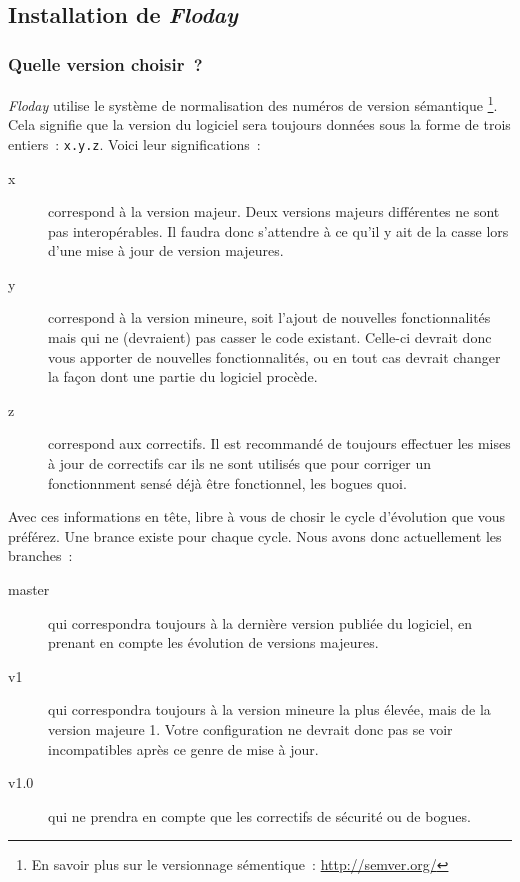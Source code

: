 \subsection{Installation de \emph{Floday}}

\subsubsection{Quelle version choisir~?}

\emph{Floday} utilise le système de normalisation des numéros de version sémantique%
\footnote{En savoir plus sur le versionnage sémentique~: \url{http://semver.org/}}.
Cela signifie que la version du logiciel sera toujours données sous la forme de trois entiers~: {\tt{}x.y.z}.
Voici leur significations~:

\begin{description}
	\item[x] correspond à la version majeur. Deux versions majeurs différentes ne sont pas interopérables.
Il faudra donc s'attendre à ce qu'il y ait de la casse lors d'une mise à jour  de version majeures.
	\item[y] correspond à la version mineure, soit l'ajout de nouvelles fonctionnalités mais qui ne (devraient) pas casser le code existant. Celle-ci devrait donc vous apporter de nouvelles fonctionnalités, ou en tout cas devrait changer la façon dont une partie du logiciel procède.
	\item[z] correspond aux correctifs. Il est recommandé de toujours effectuer les mises à jour de correctifs car ils ne sont utilisés que pour corriger un fonctionnment sensé déjà être fonctionnel, les bogues quoi.
\end{description}

Avec ces informations en tête, libre à vous de chosir le cycle d'évolution que vous préférez. Une brance existe pour chaque cycle. Nous avons donc actuellement les branches~:
\begin{description}
	\item[master] qui correspondra toujours à la dernière version publiée du logiciel, en prenant en compte les évolution de versions majeures.
	\item[v1] qui correspondra toujours à la version mineure la plus élevée, mais de la version majeure 1. Votre configuration ne devrait donc pas se voir incompatibles après ce genre de mise à jour.
	\item[v1.0] qui ne prendra en compte que les correctifs de sécurité ou de bogues.
\end{description}

